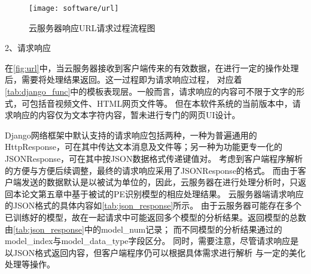 \begin{figure}[h]
    \centering
    \texttt{[image: software/url]}
    \caption{\label{fig:url}云服务器响应URL请求过程流程图}
\end{figure}

2、请求响应

在\autoref{fig:url}中，当云服务器接收到客户端传来的有效数据，在进行一定的操作处理后，需要将处理结果返回。这一过程即为请求响应过程，
对应着\autoref{tab:django_func}中的模板表现层。一般而言，请求响应的内容可不限于文字的形式，可包括音视频文件、HTML网页文件等。
但在本软件系统的当前版本中，请求响应的内容仅为文本字符内容，暂未进行专门的网页UI设计。

Django网络框架中默认支持的请求响应包括两种，一种为普遍通用的HttpResponse，可在其中传达文本消息及文件等；另一种为功能更专一化的JSONResponse，可在其中按JSON数据格式传递键值对。
考虑到客户端程序解析的方便与方便后续调整，最终的请求响应采用了JSONResponse的格式。
而由于客户端发送的数据默认是以被试为单位的，因此，云服务器在进行处理分析时，只返回本论文第五章中基于被试的PE识别模型的相应处理结果。
云服务器端请求响应的JSON格式的具体内容如\autoref{tab:json_response}所示。
由于云服务器可能存在多个已训练好的模型，故在一起请求中可能返回多个模型的分析结果。返回模型的总数由\autoref{tab:json_response}中的model\_num记录；
而不同模型的分析结果通过的model\_index与model\_data\_type字段区分。
同时，需要注意，尽管请求响应是以JSON格式返回内容，但客户端程序仍可以根据具体需求进行解析
与一定的美化处理等操作。

